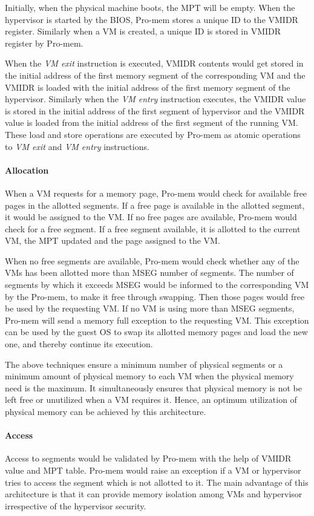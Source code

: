 \documentclass[a4paper,10pt,twocolumn]{article}
\begin{document}
  Initially, when the physical machine boots, the MPT will be empty. When the hypervisor is started by the BIOS, Pro-mem stores a unique ID to the VMIDR register. Similarly when a VM is created, a unique ID is stored in VMIDR register by Pro-mem.

  When the \textit{VM exit} instruction is executed, VMIDR contents would get stored in the initial address of the first memory segment of the corresponding VM and the  VMIDR is loaded with the initial address of the first memory segment of the hypervisor. Similarly when the \textit{VM entry} instruction executes, the VMIDR value is  stored in the initial address of the first segment of hypervisor and the VMIDR value is loaded from the initial address of the first segment of the running VM. These load and store operations are executed by Pro-mem as atomic operations to \textit{VM exit} and \textit{VM entry} instructions.

  \paragraph{Allocation}
  When a VM requests for a memory page, Pro-mem would  check for available free pages in the allotted segments. If a free page is available in the allotted segment, it would  be assigned to the VM. If no free pages are available, Pro-mem would check for a free segment. If a free segment available, it is allotted to the current VM, the MPT updated and the page assigned to the VM.

  When no free segments are available, Pro-mem would  check whether any of the VMs has been allotted more than MSEG number of segments. The number of segments by which it exceeds  MSEG would be informed to the corresponding VM by the Pro-mem, to make it free through swapping. Then those pages would free be used by the requesting VM. If no VM is using more than MSEG segments, Pro-mem will send a memory full exception to the requesting VM. This exception can be used by the guest OS to swap its allotted memory pages and load the new one, and thereby continue its execution.

  The above techniques ensure a minimum number of physical segments or a minimum amount of physical memory to each VM when the physical memory need is the maximum. It simultaneously ensures that physical memory is not be left free or unutilized when a VM requires it. Hence, an optimum utilization of physical memory can be achieved by this architecture.

  \paragraph{Access}
  Access to  segments would  be validated by Pro-mem with the help of VMIDR value and MPT table. Pro-mem would raise an exception if a VM or hypervisor tries to access the segment which is not allotted to it.  The main advantage of this architecture is that it can provide memory isolation among VMs and hypervisor irrespective of the hypervisor security.
\end{document}

